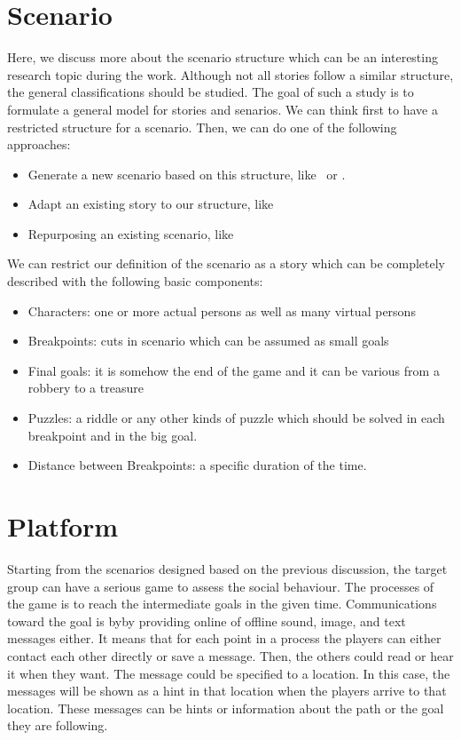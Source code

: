 \documentclass[conference]{IEEEtran}
\begin{document}
\section{Scenario}
\cite{scenario}
Here, we discuss more about the scenario structure which can be
an interesting research topic during the work.
Although not all stories follow a similar structure,
the general classifications should be studied. The goal of such a study is to 
formulate a general model for stories and senarios.
We can think first to have a restricted structure for a scenario.
Then, we can do one of the following approaches: 
\begin{itemize}
\item Generate a new scenario based on this structure, like~\cite{scenario-gen} or \cite{l-system}.
\item Adapt an existing story to our structure, like~\cite{scenario-adapt}
\item Repurposing an existing scenario, like~\cite{scneario-repurposing}
\end{itemize}

We can restrict our definition of the scenario as a story which
can be completely described with the following basic components:
\begin{itemize}
\item Characters: one or more actual persons as well as many virtual persons
\item Breakpoints: cuts in scenario which can be assumed as small goals 
\item Final goals: it is somehow the end of the game and 
it can be various from a robbery to a treasure
\item Puzzles: a riddle or any other kinds of puzzle which should be solved in each 
      breakpoint and in the big goal.
\item Distance between Breakpoints: a specific duration of the time.
\end{itemize}

\section{Platform}
Starting from the scenarios designed based on the previous discussion,
the target group can have a serious game to assess the social behaviour.
The processes of the game is to reach the intermediate goals in the given time.
Communications toward the goal is byby providing online of offline sound, image, and text messages either. 
It means that for each point in a process the players can either contact each other directly or save a message. 
Then, the others could read or hear it when they want. The message could be specified to a location. In this case, 
the messages will be shown as a hint in that location when the players arrive to that location. These messages can be hints or information about the path or the goal they are following.
\end{document}
